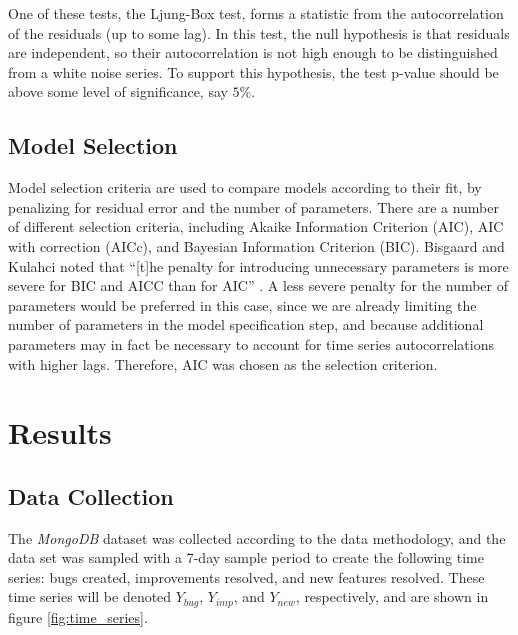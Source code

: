 \documentclass[letterpaper]{report}
\begin{document}
One of these tests, the Ljung-Box test, forms a statistic from the autocorrelation of the residuals (up to some lag). In this test, the null hypothesis is that residuals are independent, so their autocorrelation is not high enough to be distinguished from a white noise series. To support this hypothesis, the test p-value should be above some level of significance, say $5\%$. 


\section*{Model Selection}
Model selection criteria are used to compare models according to their fit, by penalizing for residual error and the number of parameters. There are a number of different selection criteria, including Akaike Information Criterion (AIC), AIC with correction (AICc), and Bayesian Information Criterion (BIC). Bisgaard and Kulahci noted that “[t]he penalty for introducing unnecessary parameters is more severe for BIC and AICC than for AIC” \cite{bisgaard2011time}. A less severe penalty for the number of parameters would be preferred in this case, since we are already limiting the number of parameters in the model specification step, and because additional parameters may in fact be necessary to account for time series autocorrelations with higher lags. Therefore, AIC was chosen as the selection criterion.


\chapter{Results}
\label{sec:results}

\section*{Data Collection}

The \textit{MongoDB} dataset was collected according to the data methodology, and the data set was sampled with a 7-day sample period to create the following time series: bugs created, improvements resolved, and new features resolved. These time series will be denoted $Y_{bug}$, $Y_{imp}$, and $Y_{new}$, respectively, and are shown in figure \ref{fig:time_series}.
\end{document}
